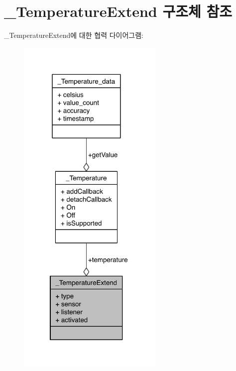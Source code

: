\hypertarget{struct__TemperatureExtend}{\section{\-\_\-\-Temperature\-Extend 구조체 참조}
\label{struct__TemperatureExtend}
}


\-\_\-\-Temperature\-Extend에 대한 협력 다이어그램\-:\nopagebreak
\begin{figure}[H]
\begin{center}
\leavevmode
\includegraphics[width=197pt]{d2/da6/struct__TemperatureExtend__coll__graph}
\end{center}
\end{figure}
